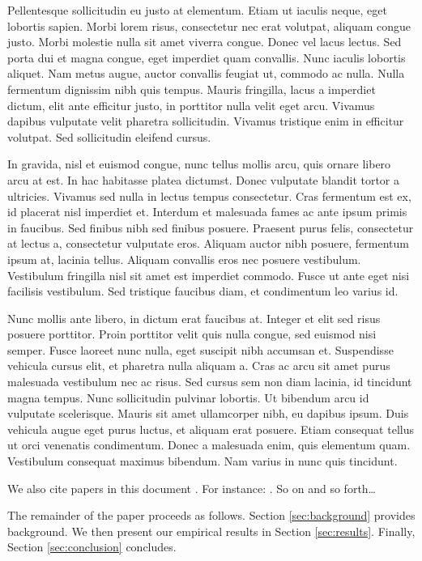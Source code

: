 \documentclass[12pt]{article}
\begin{document}
Pellentesque sollicitudin eu justo at elementum. Etiam ut iaculis neque, eget lobortis sapien. Morbi lorem risus, consectetur nec erat volutpat, aliquam congue justo. Morbi molestie nulla sit amet viverra congue. Donec vel lacus lectus. Sed porta dui et magna congue, eget imperdiet quam convallis. Nunc iaculis lobortis aliquet. Nam metus augue, auctor convallis feugiat ut, commodo ac nulla. Nulla fermentum dignissim nibh quis tempus. Mauris fringilla, lacus a imperdiet dictum, elit ante efficitur justo, in porttitor nulla velit eget arcu. Vivamus dapibus vulputate velit pharetra sollicitudin. Vivamus tristique enim in efficitur volutpat. Sed sollicitudin eleifend cursus.

In gravida, nisl et euismod congue, nunc tellus mollis arcu, quis ornare libero arcu at est. In hac habitasse platea dictumst. Donec vulputate blandit tortor a ultricies. Vivamus sed nulla in lectus tempus consectetur. Cras fermentum est ex, id placerat nisl imperdiet et. Interdum et malesuada fames ac ante ipsum primis in faucibus. Sed finibus nibh sed finibus posuere. Praesent purus felis, consectetur at lectus a, consectetur vulputate eros. Aliquam auctor nibh posuere, fermentum ipsum at, lacinia tellus. Aliquam convallis eros nec posuere vestibulum. Vestibulum fringilla nisl sit amet est imperdiet commodo. Fusce ut ante eget nisi facilisis vestibulum. Sed tristique faucibus diam, et condimentum leo varius id.

Nunc mollis ante libero, in dictum erat faucibus at. Integer et elit sed risus posuere porttitor. Proin porttitor velit quis nulla congue, sed euismod nisi semper. Fusce laoreet nunc nulla, eget suscipit nibh accumsan et. Suspendisse vehicula cursus elit, et pharetra nulla aliquam a. Cras ac arcu sit amet purus malesuada vestibulum nec ac risus. Sed cursus sem non diam lacinia, id tincidunt magna tempus. Nunc sollicitudin pulvinar lobortis. Ut bibendum arcu id vulputate scelerisque. Mauris sit amet ullamcorper nibh, eu dapibus ipsum. Duis vehicula augue eget purus luctus, et aliquam erat posuere. Etiam consequat tellus ut orci venenatis condimentum. Donec a malesuada enim, quis elementum quam. Vestibulum consequat maximus bibendum. Nam varius in nunc quis tincidunt.

We also cite papers in this document \citep{Chetty2013}. For instance: \citet{Hansen1992}. So on and so forth\ldots

The remainder of the paper proceeds as follows. Section \ref{sec:background} provides background. We then present our
empirical results in Section \ref{sec:results}. Finally, Section \ref{sec:conclusion} concludes. 
\end{document}
